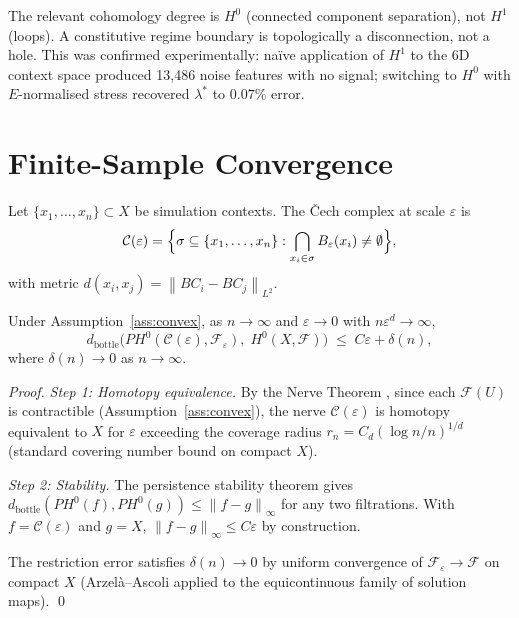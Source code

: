 \documentclass[twoside,11pt]{article}
\newcommand{\FA}{\mathcal{F}}
\newcommand{\CA}{\mathcal{C}}
\newcommand{\db}{d_{\mathrm{bottle}}}
\newcommand{\norm}[1]{\left\lVert#1\right\rVert}
\newcommand{\LAMBDASTAR}{\lambda^*}
\begin{document}
\begin{remark}
\label{rem:h0}
The relevant cohomology degree is $H^0$ (connected component
separation), not $H^1$ (loops). A constitutive regime boundary is
topologically a disconnection, not a hole. This was confirmed
experimentally: na\"ive application of $H^1$ to the 6D context space
produced 13,486 noise features with no signal; switching to $H^0$ with
$E$-normalised stress recovered $\LAMBDASTAR$ to $0.07\%$ error.
\end{remark}

\section{Finite-Sample Convergence}
\label{sec:convergence}

Let $\{x_1,\ldots,x_n\} \subset X$ be simulation contexts. The
\v{C}ech complex at scale $\varepsilon$ is
\[
  \CA(\varepsilon) = \Bigl\{\sigma \subseteq \{x_1,\ldots,x_n\} :
  \bigcap_{x_i \in \sigma} B_\varepsilon(x_i) \neq \emptyset\Bigr\},
\]
with metric $d(x_i,x_j) = \norm{BC_i - BC_j}_{L^2}$.

\begin{theorem}
\label{thm:convergence}
Under Assumption~\ref{ass:convex}, as $n \to \infty$ and
$\varepsilon \to 0$ with $n\varepsilon^d \to \infty$,
\begin{equation}
  \db\bigl(PH^0(\CA(\varepsilon),\FA_\varepsilon),\;
  H^0(X,\FA)\bigr)
  \;\leq\; C\varepsilon + \delta(n),
  \label{eq:stability}
\end{equation}
where $\delta(n) \to 0$ as $n \to \infty$.
\end{theorem}

\begin{proof}
\emph{Step 1: Homotopy equivalence.}
By the Nerve Theorem \citep{borsuk1948imbedding}, since each
$\FA(U)$ is contractible (Assumption~\ref{ass:convex}), the nerve
$\CA(\varepsilon)$ is homotopy equivalent to $X$ for $\varepsilon$
exceeding the coverage radius $r_n = C_d(\log n / n)^{1/d}$
(standard covering number bound on compact $X$).

\emph{Step 2: Stability.}
The persistence stability theorem \citep{cohen2007stability} gives
$\db(PH^0(f), PH^0(g)) \leq \norm{f-g}_\infty$ for any two
filtrations. With $f = \CA(\varepsilon)$ and $g = X$,
$\norm{f-g}_\infty \leq C\varepsilon$ by construction.

The restriction error satisfies $\delta(n) \to 0$ by uniform
convergence of $\FA_\varepsilon \to \FA$ on compact $X$
(Arzel\`a--Ascoli applied to the equicontinuous family of solution
maps). \qed
\end{proof}
\end{document}

